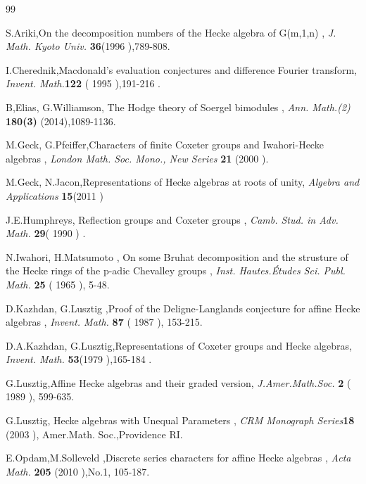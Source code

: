\def\CTEXPreproc{Created by ctex v0.2.12, don't edit!}\documentclass[11pt]{article}
\begin{document}
\begin{thebibliography}{99}



  {\sc S.Ariki},On the decomposition numbers of the Hecke algebra of G(m,1,n) , {\it J. Math. Kyoto Univ. }{\bf 36}(1996  ),789-808.


  {\sc I.Cherednik},Macdonald's evaluation conjectures and difference Fourier transform, {\it Invent. Math.}{\bf 122 }( 1995 ),191-216 .

  {\sc B,Elias, G.Williamson}, The Hodge theory of Soergel bimodules  , {\it Ann. Math.(2) }{\bf180(3) }(2014),1089-1136.


  {\sc M.Geck, G.Pfeiffer},Characters of finite Coxeter groups and Iwahori-Hecke algebras , {\it London Math. Soc. Mono., New Series }{\bf21 }(2000  ).

  {\sc M.Geck, N.Jacon},Representations of Hecke algebras at roots of unity, {\it Algebra and Applications }{\bf 15}(2011  )



  {\sc J.E.Humphreys}, Reflection groups and Coxeter groups , {\it Camb. Stud. in Adv. Math. }{\bf 29}( 1990 ) .


  {\sc N.Iwahori, H.Matsumoto }, On some Bruhat decomposition and the strusture of the Hecke rings of the p-adic Chevalley groups  , {\it Inst. Hautes.\'Etudes Sci. Publ. Math. }{\bf 25 }( 1965 ),  5-48.

  {\sc D.Kazhdan, G.Lusztig },Proof of the Deligne-Langlands conjecture for affine Hecke algebras , {\it Invent. Math.  }{\bf 87 }( 1987 ),   153-215.

  {\sc D.A.Kazhdan, G.Lusztig},Representations of Coxeter groups and Hecke algebras, {\it Invent. Math. }{\bf 53}(1979  ),165-184 .

  {\sc G.Lusztig},Affine Hecke algebras and their graded version, {\it J.Amer.Math.Soc.  }{\bf 2 }( 1989 ), 599-635.

  {\sc G.Lusztig}, Hecke algebras with Unequal Parameters   , {\it CRM Monograph Series}{\bf 18 }(2003 ), Amer.Math. Soc.,Providence RI.



  {\sc E.Opdam,M.Solleveld },Discrete series characters for affine Hecke algebras   , {\it Acta Math. }{\bf 205 }(2010  ),No.1, 105-187.






\end{thebibliography}
\end{document}

